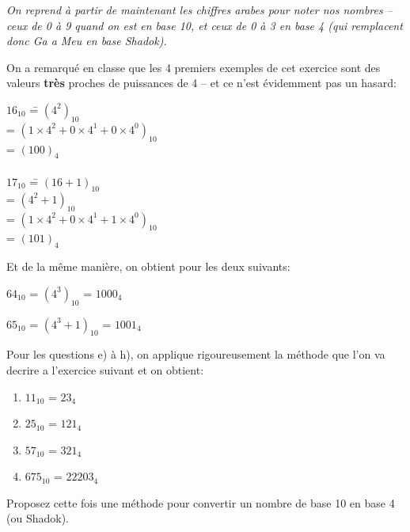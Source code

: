 \documentclass[12pt]{article}
\newenvironment{MaReponse}
		{\begin{greyedtextbox}\itshape} %
		{\end{greyedtextbox}}            %
\begin{document}
	\begin{MaReponse}
		On reprend à partir de maintenant les chiffres arabes pour noter nos nombres -- ceux de 0 à 9 quand on est en base 10, et ceux de 0 à 3 en base 4 (qui remplacent donc Ga a Meu en base Shadok).
		
		On a remarqué en classe que les 4 premiers exemples de cet exercice sont des valeurs \textbf{très} proches de puissances de 4 -- et ce n'est évidemment pas un hasard:
		\begin{tabbing}
			$16_{10}$ \==  $(4^{2})_{10}$ \\
			\>= $(1 \times 4^{2} + 0 \times 4^{1} + 0 \times 4^{0})_{10}$ \\
			\>= $(100)_{4}$
			\\ \\
			$17_{10}$ \==  $(16 + 1)_{10}$ \\
			\>=  $(4^{2} + 1)_{10}$ \\
			\>= $(1 \times 4^{2} + 0 \times 4^{1} + 1 \times 4^{0})_{10}$ \\
			\>= $(101)_{4}$
		\end{tabbing}
		Et de la même manière, on obtient pour les deux suivants:
		
		$64_{10}$ =  $(4^{3})_{10}$ =  $1000_{4}$
		
		$65_{10}$ =  $(4^{3} + 1)_{10}$ =  $1001_{4}$

		Pour les questions e) à h), on applique rigoureusement la méthode que l'on va decrire a l'exercice suivant et on obtient:
		\begin{enumerate}[label=\alph*.,start=5]
			\item $11_{10}$ = $23_4$
			\item $25_{10}$ = $121_4$
			\item $57_{10}$ = $321_4$
			\item $675_{10}$ = $22203_4$
		\end{enumerate}
	\end{MaReponse}
	
	\begin{MonExo}
		Proposez cette fois une méthode pour convertir un nombre de base 10 en base 4 (ou Shadok).
	\end{MonExo}
	
\end{document}
